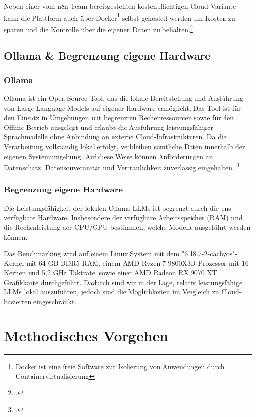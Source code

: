 \documentclass[12pt,a4paper]{article}
\begin{document}
    Neben einer vom n8n-Team bereitgestellten kostenpflichtigen Cloud-Variante kann die Plattform auch über Docker\footnote{Docker ist eine freie Software zur Isolierung von Anwendungen durch Containervirtualisierung} selbst gehosted werden um Kosten zu sparen und die Kontrolle über die eigenen Daten zu behalten.\footcite{n8n-docs}

    \subsection{Ollama \& Begrenzung eigene Hardware}

    \subsubsection{Ollama}
    Ollama ist ein Open-Source-Tool, das die lokale Bereitstellung und Ausführung von Large Language Models auf eigener Hardware ermöglicht. Das Tool ist für den Einsatz in Umgebungen mit begrenzten Rechenressourcen sowie für den Offline-Betrieb ausgelegt und erlaubt die Ausführung leistungsfähiger Sprachmodelle ohne Anbindung an externe Cloud-Infrastrukturen. Da die Verarbeitung vollständig lokal erfolgt, verbleiben sämtliche Daten innerhalb der eigenen Systemumgebung. Auf diese Weise können Anforderungen an Datenschutz, Datensouveränität und Vertraulichkeit zuverlässig eingehalten. \footcite{Ollama-Local-Models-Case-Study}

    \subsubsection{Begrenzung eigene Hardware}
    Die Leistungsfähigkeit der lokalen Ollama LLMs ist begrenzt durch die uns verfügbare Hardware. Insbesondere der verfügbare Arbeitsspeicher (RAM) und die Rechenleistung der CPU/GPU bestimmen, welche Modelle ausgeführt werden können.

    Das Benchmarking wird auf einem Linux System mit dem "6.18.7-2-cachyos"-Kernel mit 64 GB DDR5 RAM, einem AMD Ryzen 7 9800X3D Prozessor mit 16 Kernen und 5,2 GHz Taktrate, sowie einer AMD Radeon RX 9070 XT Grafikkarte durchgeführt. Dadurch sind wir in der Lage, relativ leistungsfähige LLMs lokal auszuführen, jedoch sind die Möglichkeiten im Vergleich zu Cloud-basierten eingeschränkt.


    \section{Methodisches Vorgehen}
\end{document}
